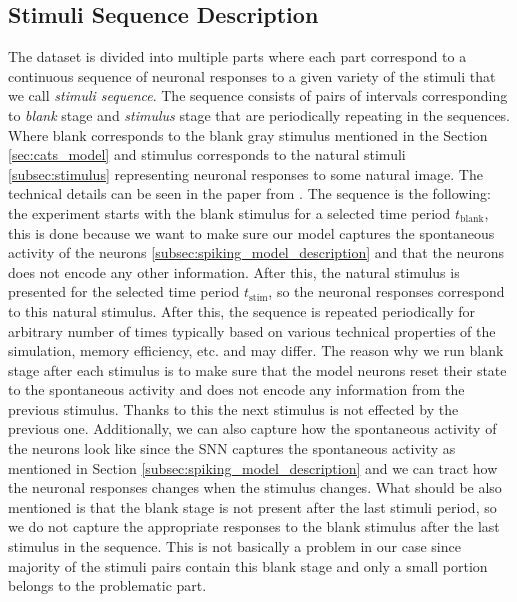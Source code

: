 \subsection{Stimuli Sequence Description}
\label{subsec:stimulus_sequence}
The dataset is divided into multiple parts where each part correspond to a continuous sequence of neuronal responses to a given variety of the stimuli that we call \emph{stimuli sequence}. The sequence consists of pairs of intervals corresponding to \emph{blank} stage and \emph{stimulus} stage that are periodically repeating in the sequences. Where blank corresponds to the blank gray stimulus mentioned in the Section \ref{sec:cats_model} and stimulus corresponds to the natural stimuli \ref{subsec:stimulus} representing neuronal responses to some natural image. The technical details can be seen in the paper from \citet{antolik2024comprehensive}. The sequence is the following: the experiment starts with the blank stimulus for a selected time period $t_{\text{blank}}$, this is done because we want to make sure our model captures the spontaneous activity of the neurons \ref{subsec:spiking_model_description} and that the neurons does not encode any other information. After this, the natural stimulus is presented for the selected time period $t_{\text{stim}}$, so the neuronal responses correspond to this natural stimulus. After this, the sequence is repeated periodically for arbitrary number of times typically based on various technical properties of the simulation, memory efficiency, etc. and may differ. The reason why we run blank stage after each stimulus is to make sure that the model neurons reset their state to the spontaneous activity and does not encode any information from the previous stimulus. Thanks to this the next stimulus is not effected by the previous one. Additionally, we can also capture how the spontaneous activity of the neurons look like since the SNN captures the spontaneous activity as mentioned in Section \ref{subsec:spiking_model_description} and we can tract how the neuronal responses changes when the stimulus changes. What should be also mentioned is that the blank stage is not present after the last stimuli period, so we do not capture the appropriate responses to the blank stimulus after the last stimulus in the sequence. This is not basically a problem in our case since majority of the stimuli pairs contain this blank stage and only a small portion belongs to the problematic part. 

